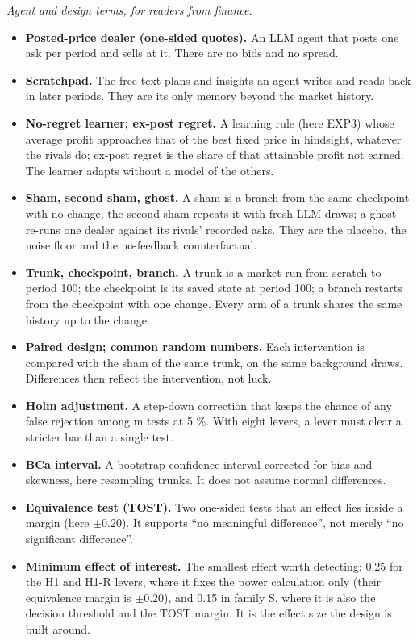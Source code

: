 \documentclass[11pt,a4paper]{article}
\begin{document}
\emph{Agent and design terms, for readers from finance.}

\begin{itemize}
\item \textbf{Posted-price dealer (one-sided quotes).} An LLM agent that posts one ask per period and sells at it. There are no bids and no spread.
\item \textbf{Scratchpad.} The free-text plans and insights an agent writes and reads back in later periods. They are its only memory beyond the market history.
\item \textbf{No-regret learner; ex-post regret.} A learning rule (here EXP3) whose average profit approaches that of the best fixed price in hindsight, whatever the rivals do; ex-post regret is the share of that attainable profit not earned. The learner adapts without a model of the others.
\item \textbf{Sham, second sham, ghost.} A sham is a branch from the same checkpoint with no change; the second sham repeats it with fresh LLM draws; a ghost re-runs one dealer against its rivals' recorded asks. They are the placebo, the noise floor and the no-feedback counterfactual.
\item \textbf{Trunk, checkpoint, branch.} A trunk is a market run from scratch to period 100; the checkpoint is its saved state at period 100; a branch restarts from the checkpoint with one change. Every arm of a trunk shares the same history up to the change.
\item \textbf{Paired design; common random numbers.} Each intervention is compared with the sham of the same trunk, on the same background draws. Differences then reflect the intervention, not luck.
\item \textbf{Holm adjustment.} A step-down correction that keeps the chance of any false rejection among m tests at 5 \%. With eight levers, a lever must clear a stricter bar than a single test.
\item \textbf{BCa interval.} A bootstrap confidence interval corrected for bias and skewness, here resampling trunks. It does not assume normal differences.
\item \textbf{Equivalence test (TOST).} Two one-sided tests that an effect lies inside a margin (here $\pm 0.20$). It supports ``no meaningful difference'', not merely ``no significant difference''.
\item \textbf{Minimum effect of interest.} The smallest effect worth detecting: 0.25 for the H1 and H1-R levers, where it fixes the power calculation only (their equivalence margin is $\pm 0.20$), and 0.15 in family S, where it is also the decision threshold and the TOST margin. It is the effect size the design is built around.
\end{itemize}
\end{document}
